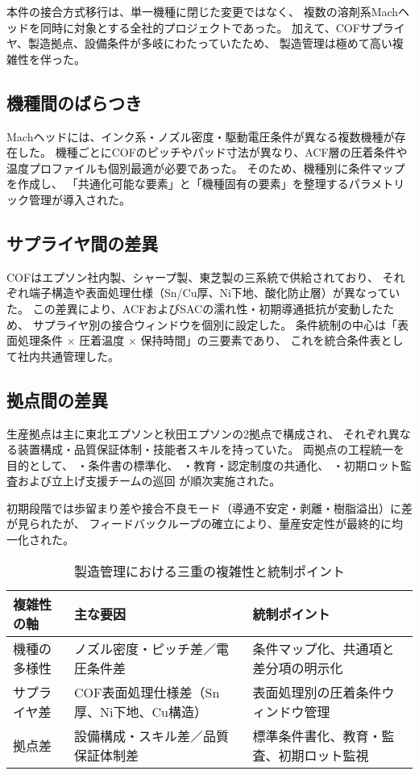 \documentclass[conference]{IEEEtran}
\begin{document}
本件の接合方式移行は、単一機種に閉じた変更ではなく、  
複数の溶剤系Machヘッドを同時に対象とする全社的プロジェクトであった。  
加えて、COFサプライヤ、製造拠点、設備条件が多岐にわたっていたため、  
製造管理は極めて高い複雑性を伴った。

\subsection{機種間のばらつき}
Machヘッドには、インク系・ノズル密度・駆動電圧条件が異なる複数機種が存在した。  
機種ごとにCOFのピッチやパッド寸法が異なり、ACF層の圧着条件や温度プロファイルも個別最適が必要であった。  
そのため、機種別に条件マップを作成し、  
「共通化可能な要素」と「機種固有の要素」を整理するパラメトリック管理が導入された。

\subsection{サプライヤ間の差異}
COFはエプソン社内製、シャープ製、東芝製の三系統で供給されており、  
それぞれ端子構造や表面処理仕様（Sn/Cu厚、Ni下地、酸化防止層）が異なっていた。  
この差異により、ACFおよびSACの濡れ性・初期導通抵抗が変動したため、  
サプライヤ別の接合ウィンドウを個別に設定した。  
条件統制の中心は「表面処理条件 × 圧着温度 × 保持時間」の三要素であり、  
これを統合条件表として社内共通管理した。

\subsection{拠点間の差異}
生産拠点は主に東北エプソンと秋田エプソンの2拠点で構成され、  
それぞれ異なる装置構成・品質保証体制・技能者スキルを持っていた。  
両拠点の工程統一を目的として、  
・条件書の標準化、  
・教育・認定制度の共通化、  
・初期ロット監査および立上げ支援チームの巡回  
が順次実施された。  

初期段階では歩留まり差や接合不良モード（導通不安定・剥離・樹脂溢出）に差が見られたが、  
フィードバックループの確立により、量産安定性が最終的に均一化された。

\begin{table}[t]
\centering
\footnotesize
\caption{製造管理における三重の複雑性と統制ポイント}
\label{tab:complexity}
\renewcommand{\arraystretch}{1.1}
\begin{tabularx}{\columnwidth}{@{}p{2.3cm} Y Y@{}}
\toprule
複雑性の軸 & 主な要因 & 統制ポイント \\
\midrule
機種の多様性 &
ノズル密度・ピッチ差／電圧条件差 &
条件マップ化、共通項と差分項の明示化 \\
\addlinespace[2pt]
サプライヤ差 &
COF表面処理仕様差（Sn厚、Ni下地、Cu構造） &
表面処理別の圧着条件ウィンドウ管理 \\
\addlinespace[2pt]
拠点差 &
設備構成・スキル差／品質保証体制差 &
標準条件書化、教育・監査、初期ロット監視 \\
\bottomrule
\end{tabularx}
\end{table}
\end{document}
